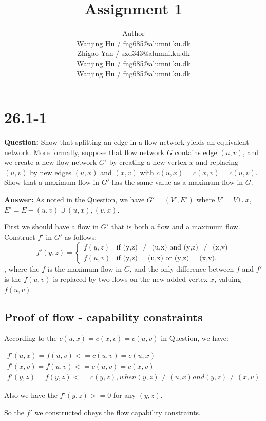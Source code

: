 \documentclass[12pt]{article}
\title{Assignment 1}
\author{Author \\
  Wanjing Hu / fng685@alumni.ku.dk  \\
  Zhigao Yan / sxd343@alumni.ku.dk  \\
  Wanjing Hu / fng685@alumni.ku.dk  \\
  Wanjing Hu / fng685@alumni.ku.dk  \\
}
\begin{document}
\maketitle


\section{26.1-1}
\textbf{Question: }Show that splitting an edge in a flow network yields an equivalent network. More formally, suppose that flow network $G$ contains edge $(u, v)$, and we create a new flow network $G'$ by creating a new vertex $x$ and replacing $(u, v)$ by new edges $(u, x)$ and $(x, v)$ with $c(u, x) = c(x, v) = c(u, v)$. Show that a maximum flow in $G'$ has the same value as a maximum flow in $G$.

\textbf{Answer: }As noted in the Question, we have $G'=(V',E')$ where $V'=V\cup{x}$, $E'=E-{(u,v)}\cup{(u,x), (v, x)}$.

First we should have a flow in $G'$ that is both a flow and a maximum flow. Construct $f'$ in $G'$ as follows:
\begin{equation}
f'(y,z) = 
\begin{cases}
f(y,z) &\mbox{if (y,z) $\neq$ (u,x) and (y,z) $\neq$ (x,v)}\\
f(u,v) &\mbox{if (y,z) = (u,x) or (y,z) = (x,v)}.
\end{cases}
\end{equation}
, where the $f$ is the maximum flow in $G$, and the only difference between $f$ and $f'$ is the $f(u,v)$ is replaced by two flows on the new added vertex $x$, valuing $f(u,v)$.

\subsection{Proof of flow - capability constraints}

According to the $c(u, x) = c(x, v) = c(u, v)$ in Question, we have:

\begin{gather}
f'(u,x) = f(u,v) <= c(u,v) = c(u,x)\\ \nonumber
f'(x,v) = f(u,v)<=c(u,v) = c(x,v)\\ \nonumber
f'(y,z) = f(y,z) <= c(y,z), when (y,z) \neq (u,x) and (y,z) \neq (x,v) \nonumber
\end{gather}

Also we have the $f'(y,z)>= 0$ for any $(y,z)$.

So the $f'$ we constructed obeys the flow capability constraints.
\end{document}
